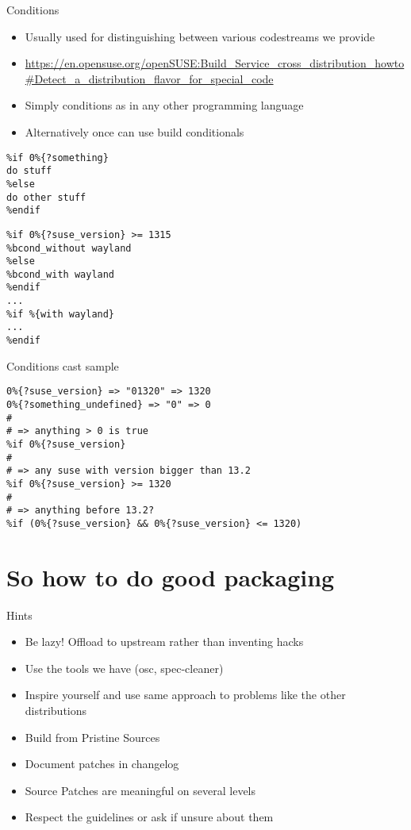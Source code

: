 \documentclass{beamer}
\begin{document}
\begin{frame}[fragile]{Conditions}
	\begin{itemize}
	\item Usually used for distinguishing between various codestreams we provide
	\item \url{https://en.opensuse.org/openSUSE:Build_Service_cross_distribution_howto#Detect_a_distribution_flavor_for_special_code}
	\item Simply conditions as in any other programming language
	\item Alternatively once can use build conditionals
	\end{itemize}
	\begin{small}
	\begin{verbatim}
%if 0%{?something}
do stuff
%else
do other stuff
%endif
	\end{verbatim}
	\end{small}
	\begin{small}
	\begin{verbatim}
%if 0%{?suse_version} >= 1315
%bcond_without wayland
%else
%bcond_with wayland
%endif
...
%if %{with wayland}
...
%endif
	\end{verbatim}
	\end{small}
\end{frame}

\begin{frame}[fragile]{Conditions cast sample}
       \begin{small}
       \begin{verbatim}
0%{?suse_version} => "01320" => 1320
0%{?something_undefined} => "0" => 0
#
# => anything > 0 is true
%if 0%{?suse_version}
#
# => any suse with version bigger than 13.2
%if 0%{?suse_version} >= 1320
#
# => anything before 13.2?
%if (0%{?suse_version} && 0%{?suse_version} <= 1320)
       \end{verbatim}
       \end{small}
\end{frame}

\section{So how to do good packaging}

\begin{frame}[t]{Hints}
	\begin{itemize}
	\item Be lazy! Offload to upstream rather than inventing hacks
    \item Use the tools we have (osc, spec-cleaner)
    \item Inspire yourself and use same approach to problems like the other distributions
    \item Build from Pristine Sources
    \item Document patches in changelog
    \item Source Patches are meaningful on several levels
    \item Respect the guidelines or ask if unsure about them
	\end{itemize}
\end{frame}
\end{document}

